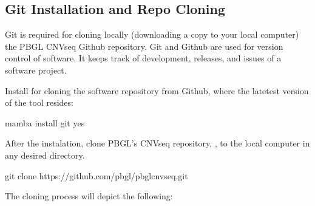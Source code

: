 \documentclass[letterpaper,10pt,english]{sphinxhowto}
\begin{document}
\subsection{Git Installation and Repo Cloning}
\label{\detokenize{index:git-installation-and-repo-cloning}}
\sphinxAtStartPar
Git is required for cloning locally (downloading a copy to your local computer) the PBGL CNVseq Github repository. Git and Github are used for version control of software. It keeps track of development, releases, and issues of a software project.

\sphinxAtStartPar
Install  for cloning the  software repository from Github, where the latetest version of the tool resides:

\begin{sphinxVerbatim}[commandchars=\\\{\}]
\PYGZdl{} mamba install git \PYGZhy{}\PYGZhy{}yes
\end{sphinxVerbatim}

\sphinxAtStartPar
After the instalation, clone PBGL’s CNVseq repository, , to the local computer in any desired directory.

\begin{sphinxVerbatim}[commandchars=\\\{\}]
\PYGZdl{} git clone https://github.com/pbgl/pbgl\PYGZhy{}cnvseq.git
\end{sphinxVerbatim}

\sphinxAtStartPar
The cloning process will depict the following:

\begin{sphinxVerbatim}[commandchars=\\\{\}]
  
    
     
     
          
         
    
\end{sphinxVerbatim}
\end{document}

